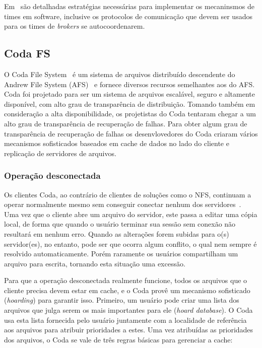 Em~\cite{kumar2000adaptive} são detalhadas estratégias necessárias para implementar os mecaninsmos de times em software, inclusive os protocolos de comunicação que devem ser usados para os times de \emph{brokers} se autocoordenarem.


\subsection{Coda FS} %
\label{sub:coda_fs}

O Coda File System~\cite{satyanarayanan1990coda} é um sistema de arquivos distribuído descendente do Andrew File System (AFS)~\cite{howard1988overview} e fornece diversos recursos semelhantes aos do AFS. Coda foi projetado para ser um sistema de arquivos escalável, seguro e altamente disponível, com alto grau de transparência de distribuição. Tomando também em consideração a alta disponibilidade, os projetistas do Coda tentaram chegar a um alto grau de transparência de recuperação de falhas. Para obter algum grau de transparência de recuperação de falhas os desenvlovedores do Coda criaram vários mecanismos sofisticados baseados em cache de dados no lado do cliente e replicação de servidores de arquivos.

\subsubsection*{Operação desconectada}

Os clientes Coda, ao contrário de clientes de soluções como o NFS, continuam a operar normalmente mesmo sem conseguir conectar nenhum dos servidores~\cite{kistler1992disconnected}. Uma vez que o cliente abre um arquivo do servidor, este  passa a editar uma cópia local, de forma que quando o usuário terminar sua sessão sem conexão não resultará em nenhum erro. Quando as alterações forem subidas para o(s) servidor(es), no entanto, pode ser que ocorra algum conflito, o qual nem sempre é resolvido automaticamente. Porém raramente os usuários compartilham um arquivo para escrita, tornando esta situação uma excessão.

Para que a operação desconectada realmente funcione, todos os arquivos que o cliente precisa devem estar em cache, e o Coda provê um mecanismo sofisticado (\emph{hoarding}) para garantir isso. Primeiro, um usuário pode criar uma lista dos arquivos que julga serem os mais importantes para ele (\emph{hoard database}). O Coda usa esta lista fornecida pelo usuário juntamente com a localidade de referência aos arquivos para atribuir prioridades a estes. Uma vez atribuídas as prioridades dos arquivos, o Coda se vale de três regras básicas para gerenciar a cache:

